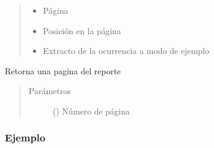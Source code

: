 \documentclass[a4paper,12pt,spanish]{sphinxmanual}
\begin{document}
\begin{fulllineitems}
\begin{fulllineitems}
\begin{quote}
\begin{description}
\begin{description}
\begin{itemize}
\item {} 
Página

\item {} 
Posición en la página

\item {} 
Extracto de la ocurrencia a modo de ejemplo

\end{itemize}

\end{description}


\end{description}\end{quote}

\end{fulllineitems}


\begin{fulllineitems}
\label{\detokenize{openerm.Report:openerm.Report.Report.get_page}}
Retorna una pagina del reporte
\begin{quote}\begin{description}
\item[{Parámetros}] \leavevmode
{} () \textendash{} Número de página

\end{description}\end{quote}
\subsubsection*{Ejemplo}


\end{fulllineitems}
\end{fulllineitems}
\end{document}
